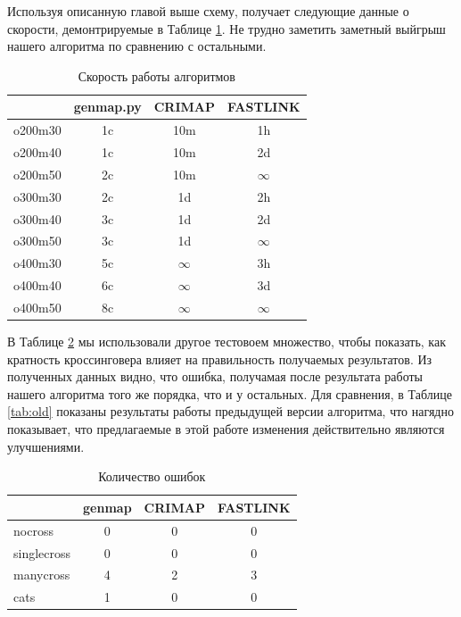 \documentclass{matmex-diploma-custom}
\begin{document}
Используя описанную главой выше схему, получает следующие данные о
скорости, демонтрируемые в Таблице \ref{tab:perf}. Не трудно заметить
заметный выйгрыш нашего алгоритма по сравнению с остальными.
\begin{table}[h]
  \centering
  \begin{tabular}{lccc}
    \hline
    & genmap.py & CRIMAP & FASTLINK \\
    \hline
    o200m30 & 1c & 10m & 1h \\
    o200m40 & 1c & 10m & 2d \\
    o200m50 & 2c & 10m & $\infty$ \\
    o300m30 & 2c & 1d & 2h \\
    o300m40 & 3c & 1d & 2d \\
    o300m50 & 3c & 1d & $\infty$ \\
    o400m30 & 5c & $\infty$ & 3h \\
    o400m40 & 6c & $\infty$ & 3d \\
    o400m50 & 8c & $\infty$ & $\infty$ \\
    \hline
  \end{tabular}

  \caption{Скорость работы алгоритмов}
  \label{tab:perf}
\end{table}

В Таблице \ref{tab:qual} мы использовали другое тестовоем множество,
чтобы показать, как кратность кроссинговера влияет на правильность
получаемых результатов. Из полученных данных видно, что ошибка,
получамая после результата работы нашего алгоритма того же порядка,
что и у остальных. Для сравнения, в Таблице \ref{tab:old} показаны
результаты работы предыдущей версии алгоритма, что нагядно показывает,
что предлагаемые в этой работе изменения действительно являются
улучшениями.

\begin{table}[h]
  \centering
  \begin{tabular}{lccc}
    \hline
    & genmap & CRIMAP & FASTLINK \\
    \hline
    nocross & 0 & 0 & 0 \\
    singlecross & 0 & 0 & 0 \\
    manycross & 4 & 2 & 3 \\
    cats & 1 & 0 & 0 \\
    \hline
  \end{tabular}
  \caption{Количество ошибок}
  \label{tab:qual}
\end{table}
\end{document}
